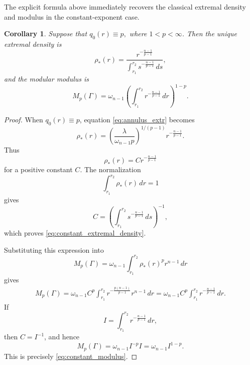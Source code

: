 \documentclass[12pt]{amsart}
\numberwithin{equation}{section}
\theoremstyle{plain}
\newtheorem{corollary}[equation]{Corollary}
\theoremstyle{definition}
\begin{document}
The explicit formula above immediately recovers the classical extremal
density and modulus in the constant-exponent case.
\begin{corollary}
\label{cor:constant_exp}
Suppose that $q_0(r)\equiv p,$ where $1<p<\infty$.
Then the unique extremal density is
\begin{equation}
\label{eq:constant_extremal_density}
\rho_*(r)
=
\frac{
r^{-\frac{n-1}{p-1}}
}{
\displaystyle
\int_{r_1}^{r_2}
s^{-\frac{n-1}{p-1}}\,ds
},
\end{equation}
and the modular modulus is
\begin{equation}
\label{eq:constant_modulus}
M_p(\Gamma)
=
\omega_{n-1}
\left(
\int_{r_1}^{r_2}
r^{-\frac{n-1}{p-1}}\,dr
\right)^{1-p}.
\end{equation}
\end{corollary}

\begin{proof}
When $q_0(r)\equiv p$, equation \eqref{eq:annulus_extr} becomes
\begin{equation*}
\rho_*(r)
=
\left(
\frac{\lambda}
{\omega_{n-1}p}
\right)^{1/(p-1)}
r^{-\frac{n-1}{p-1}}.
\end{equation*}
Thus
\begin{equation*}
\rho_*(r)=C r^{-\frac{n-1}{p-1}}
\end{equation*}
for a positive constant $C$. The normalization
\begin{equation*}
\int_{r_1}^{r_2}\rho_*(r)\,dr=1
\end{equation*}
gives
\begin{equation*}
C
=
\left(
\int_{r_1}^{r_2}
s^{-\frac{n-1}{p-1}}\,ds
\right)^{-1},
\end{equation*}
which proves \eqref{eq:constant_extremal_density}.

Substituting this expression into
\begin{equation*}
M_p(\Gamma)
=
\omega_{n-1}
\int_{r_1}^{r_2}
\rho_*(r)^p r^{n-1}\,dr
\end{equation*}
gives
\begin{align*}
M_p(\Gamma)
=
\omega_{n-1}C^p
\int_{r_1}^{r_2}
r^{-\frac{p(n-1)}{p-1}}r^{n-1}\,dr
=
\omega_{n-1}C^p
\int_{r_1}^{r_2}
r^{-\frac{n-1}{p-1}}\,dr.
\end{align*}
If
\begin{equation*}
I=
\int_{r_1}^{r_2}
r^{-\frac{n-1}{p-1}}\,dr,
\end{equation*}
then $C=I^{-1}$, and hence
\begin{equation*}
M_p(\Gamma)
=
\omega_{n-1}I^{-p}I
=
\omega_{n-1}I^{1-p}.
\end{equation*}
This is precisely \eqref{eq:constant_modulus}.
\end{proof}
\end{document}
